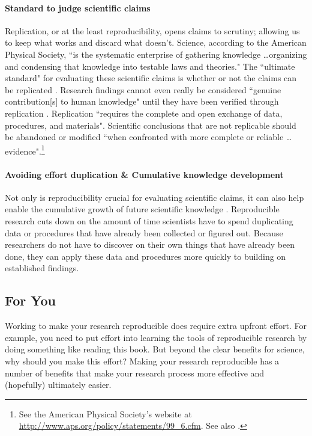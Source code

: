 \paragraph{Standard to judge scientific claims} 
Replication, or at the least reproducibility, opens claims to scrutiny; allowing us to keep what works and discard what doesn't. Science, according to the American Physical Society, ``is the systematic enterprise of gathering knowledge \ldots organizing and condensing that knowledge into testable laws and theories." The ``ultimate standard" for evaluating these scientific claims is whether or not the claims can be replicated \cite[]{Peng2011,Kelly2006}. Research findings cannot even really be considered ``genuine contribution[s] to human knowledge" until they have been verified through replication \cite[38]{Stodden2009}. Replication ``requires the complete and open exchange of data, procedures, and materials". Scientific conclusions that are not replicable should be abandoned or modified ``when confronted with more complete or reliable \ldots evidence".\footnote{See the American Physical Society's website at \url{http://www.aps.org/policy/statements/99_6.cfm}. See also \cite{Fomel2009}.} 

\paragraph{Avoiding effort duplication \& Cumulative knowledge development} 
Not only is reproducibility crucial for evaluating scientific claims, it can also help enable the cumulative growth of future scientific knowledge \cite[]{Kelly2006,King1995}. Reproducible research cuts down on the amount of time scientists have to spend duplicating data or procedures that have already been collected or figured out. Because researchers do not have to discover on their own things that have already been done, they can apply these data and procedures more quickly to building on established findings.

\subsection{For You}

Working to make your research reproducible does require extra upfront effort. For example, you need to put effort into learning the tools of reproducible research by doing something like reading this book. But beyond the clear benefits for science, why should you make this effort? Making your research reproducible has a number of benefits that make your research process more effective and (hopefully) ultimately easier.

